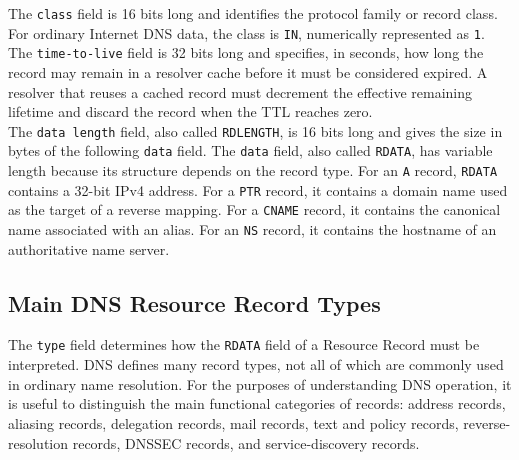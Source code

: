 \documentclass{scrbook}
\begin{document}
	The \texttt{class} field is 16 bits long and identifies the protocol family or record class. For ordinary Internet DNS data, the class is \texttt{IN}, numerically represented as \texttt{1}.\\
	
	The \texttt{time-to-live} field is 32 bits long and specifies, in seconds, how long the record may remain in a resolver cache before it must be considered expired. A resolver that reuses a cached record must decrement the effective remaining lifetime and discard the record when the TTL reaches zero.\\
	
	The \texttt{data length} field, also called \texttt{RDLENGTH}, is 16 bits long and gives the size in bytes of the following \texttt{data} field. The \texttt{data} field, also called \texttt{RDATA}, has variable length because its structure depends on the record type. For an \texttt{A} record, \texttt{RDATA} contains a 32-bit IPv4 address. For a \texttt{PTR} record, it contains a domain name used as the target of a reverse mapping. For a \texttt{CNAME} record, it contains the canonical name associated with an alias. For an \texttt{NS} record, it contains the hostname of an authoritative name server.
	
	\subsection{Main DNS Resource Record Types}
	
	The \texttt{type} field determines how the \texttt{RDATA} field of a Resource Record must be interpreted. DNS defines many record types, not all of which are commonly used in ordinary name resolution. For the purposes of understanding DNS operation, it is useful to distinguish the main functional categories of records: address records, aliasing records, delegation records, mail records, text and policy records, reverse-resolution records, DNSSEC records, and service-discovery records.
	
\end{document}
